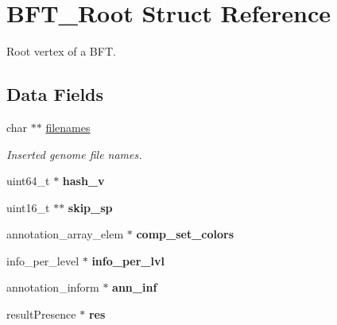 \hypertarget{structBFT__Root}{}\section{B\+F\+T\+\_\+\+Root Struct Reference}
\label{structBFT__Root}


Root vertex of a B\+FT.  


\subsection*{Data Fields}
\begin{DoxyCompactItemize}
\item 
char $\ast$$\ast$ \hyperlink{structBFT__Root_a8022a504e2c0dd2d800efda892413ce7}{filenames}
\begin{DoxyCompactList}\small\item\em Inserted genome file names. \end{DoxyCompactList}\item 
uint64\+\_\+t $\ast$ {\bfseries hash\+\_\+v}\hypertarget{structBFT__Root_a789074cc3578299eaaba89b29dd5fadb}{}\label{structBFT__Root_a789074cc3578299eaaba89b29dd5fadb}

\item 
uint16\+\_\+t $\ast$$\ast$ {\bfseries skip\+\_\+sp}\hypertarget{structBFT__Root_a7cb8a4466eecbbf38c65c5dc47ee0d2d}{}\label{structBFT__Root_a7cb8a4466eecbbf38c65c5dc47ee0d2d}

\item 
annotation\+\_\+array\+\_\+elem $\ast$ {\bfseries comp\+\_\+set\+\_\+colors}\hypertarget{structBFT__Root_ac4116550c32152d92c31fb7fad439967}{}\label{structBFT__Root_ac4116550c32152d92c31fb7fad439967}

\item 
info\+\_\+per\+\_\+level $\ast$ {\bfseries info\+\_\+per\+\_\+lvl}\hypertarget{structBFT__Root_a30af03cee8ba9b5657d8b4f329d21e71}{}\label{structBFT__Root_a30af03cee8ba9b5657d8b4f329d21e71}

\item 
annotation\+\_\+inform $\ast$ {\bfseries ann\+\_\+inf}\hypertarget{structBFT__Root_afcaa7dcf9bdb8550b76c6b0327b86065}{}\label{structBFT__Root_afcaa7dcf9bdb8550b76c6b0327b86065}

\item 
result\+Presence $\ast$ {\bfseries res}\hypertarget{structBFT__Root_ae520818d6f6ff0178671c24db1f5c1c3}{}\label{structBFT__Root_ae520818d6f6ff0178671c24db1f5c1c3}


\end{DoxyCompactItemize}
